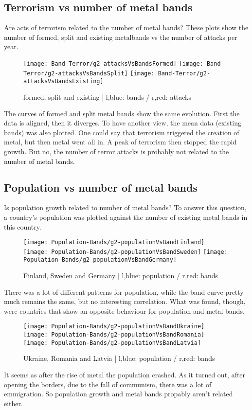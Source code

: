 \subsection{Terrorism vs number of metal bands}
Are acts of terrorism related to the number of metal bands? These plots show the number of formed, split and existing metalbands vs the number of attacks per year.
\begin{figure}[hbt!]
	\texttt{[image: Band-Terror/g2-attacksVsBandsFormed]}
	\centering
	\texttt{[image: Band-Terror/g2-attacksVsBandsSplit]}
	\texttt{[image: Band-Terror/g2-attacksVsBandsExisting]}
	\caption{formed, split and existing | l,blue: bands / r,red: attacks}
\end{figure}
The curves of formed and split metal bands show the same evolution. First the data is aligned, then it diverges. To have another view, the mean data (existing bands) was also plotted. One could say that terrorism triggered the creation of metal, but then metal went all in. A peak of terrorism then stopped the rapid growth. But no, the number of terror attacks is probably not related to the number of metal bands.


\subsection{Population vs number of metal bands}
Is population growth related to number of metal bands? To answer this question, a country's population was plotted against the number of existing metal bands in this country.
\begin{figure}[ht!]
	\texttt{[image: Population-Bands/g2-populationVsBandFinland]}
	\centering
	\texttt{[image: Population-Bands/g2-populationVsBandSweden]}
	\texttt{[image: Population-Bands/g2-populationVsBandGermany]}
	\caption{Finland, Sweden and Germany | l,blue: population / r,red: bands}
\end{figure}
There was a lot of different patterns for population, while the band curve pretty much remains the same, but no interesting correlation. What was found, though, were countries that show an opposite behaviour for population and metal bands.
\begin{figure}[hbt!]
	\texttt{[image: Population-Bands/g2-populationVsBandUkraine]}
	\centering
	\texttt{[image: Population-Bands/g2-populationVsBandRomania]}
	\texttt{[image: Population-Bands/g2-populationVsBandLatvia]}
	\caption{Ukraine, Romania and Latvia | l,blue: population / r,red: bands}
\end{figure}
It seems as after the rise of metal the population crashed. As it turned out, after opening the borders, due to the fall of communism, there was a lot of emmigration. So population growth and metal bands propably aren't related either.

